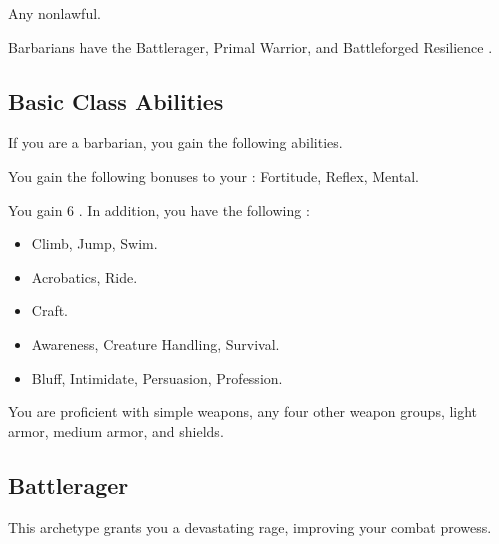      Any nonlawful.

     Barbarians have the Battlerager, Primal Warrior, and Battleforged Resilience .

    \subsection{Basic Class Abilities}
        If you are a barbarian, you gain the following abilities.

        You gain the following bonuses to your :  Fortitude,  Reflex,  Mental.

        You gain 6 .
        In addition, you have the following :
        \begin{itemize}
            \item {} Climb, Jump, Swim.
            \item {} Acrobatics, Ride.
            \item {} Craft.
            \item {} Awareness, Creature Handling, Survival.
            \item {} Bluff, Intimidate, Persuasion, Profession.
        \end{itemize}

        You are proficient with simple weapons, any four other weapon groups, light armor, medium armor, and shields.

    \subsection{Battlerager}\label{Rage}
        This archetype grants you a devastating rage, improving your combat prowess.


